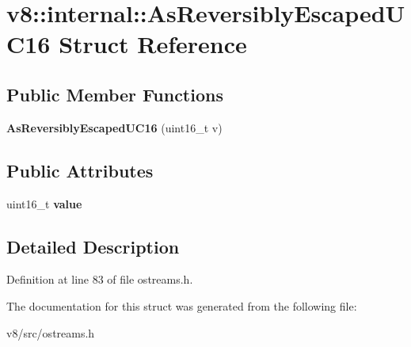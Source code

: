 \hypertarget{structv8_1_1internal_1_1AsReversiblyEscapedUC16}{}\section{v8\+:\+:internal\+:\+:As\+Reversibly\+Escaped\+U\+C16 Struct Reference}
\label{structv8_1_1internal_1_1AsReversiblyEscapedUC16}
\subsection*{Public Member Functions}
\begin{DoxyCompactItemize}
\item 
\mbox{\label{structv8_1_1internal_1_1AsReversiblyEscapedUC16_ac717767d695ca1c9a5a583d9dbc679d0}} 
{\bfseries As\+Reversibly\+Escaped\+U\+C16} (uint16\+\_\+t v)
\end{DoxyCompactItemize}
\subsection*{Public Attributes}
\begin{DoxyCompactItemize}
\item 
\mbox{\label{structv8_1_1internal_1_1AsReversiblyEscapedUC16_a60d74ea24e39df7e99a6b9cb00b71e0b}} 
uint16\+\_\+t {\bfseries value}
\end{DoxyCompactItemize}


\subsection{Detailed Description}


Definition at line 83 of file ostreams.\+h.



The documentation for this struct was generated from the following file\+:\begin{DoxyCompactItemize}
\item 
v8/src/ostreams.\+h\end{DoxyCompactItemize}
